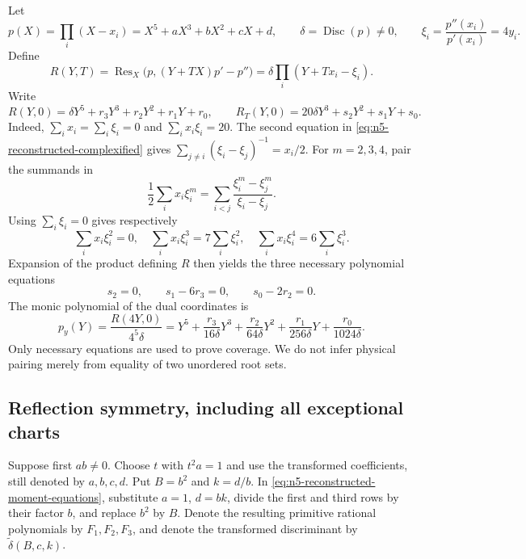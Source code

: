 \documentclass[11pt]{article}
\theoremstyle{remark}
\numberwithin{equation}{section}
\begin{document}
Let
\[
 p(X)=\prod_i(X-x_i)=X^5+aX^3+bX^2+cX+d,
 \qquad \delta=\operatorname{Disc}(p)\ne0,
 \qquad \xi_i=\frac{p''(x_i)}{p'(x_i)}=4y_i.
\]
Define
\[
 R(Y,T)=\operatorname{Res}_X\bigl(p,(Y+TX)p'-p''\bigr)
        =\delta\prod_i(Y+Tx_i-\xi_i).
\]
Write
\[
 R(Y,0)=\delta Y^5+r_3Y^3+r_2Y^2+r_1Y+r_0,
 \qquad
 R_T(Y,0)=20\delta Y^3+s_2Y^2+s_1Y+s_0.
\]
Indeed, $\sum_i x_i=\sum_i\xi_i=0$ and
$\sum_i x_i\xi_i=20$. The second equation in
\eqref{eq:n5-reconstructed-complexified} gives
$\sum_{j\ne i}(\xi_i-\xi_j)^{-1}=x_i/2$.
For $m=2,3,4$, pair the summands in
\[
 \frac12\sum_i x_i\xi_i^m
 =\sum_{i<j}\frac{\xi_i^m-\xi_j^m}{\xi_i-\xi_j}.
\]
Using $\sum_i\xi_i=0$ gives respectively
\[
 \sum_i x_i\xi_i^2=0,\quad
 \sum_i x_i\xi_i^3=7\sum_i\xi_i^2,\quad
 \sum_i x_i\xi_i^4=6\sum_i\xi_i^3.
\]
Expansion of the product defining $R$ then yields the three necessary
polynomial equations
\begin{equation}\label{eq:n5-reconstructed-moment-equations}
 s_2=0,\qquad s_1-6r_3=0,\qquad s_0-2r_2=0.
\end{equation}
The monic polynomial of the dual coordinates is
\begin{equation}\label{eq:n5-reconstructed-dual}
 p_y(Y)=\frac{R(4Y,0)}{4^5\delta}
 =Y^5+\frac{r_3}{16\delta}Y^3+
       \frac{r_2}{64\delta}Y^2+
       \frac{r_1}{256\delta}Y+
       \frac{r_0}{1024\delta}.
\end{equation}
Only necessary equations are used to prove coverage. We do not infer
physical pairing merely from equality of two unordered root sets.

\subsection{Reflection symmetry, including all exceptional charts}
Suppose first $ab\ne0$. Choose $t$ with $t^2a=1$ and use the transformed
coefficients, still denoted by $a,b,c,d$. Put $B=b^2$ and $k=d/b$.
In \eqref{eq:n5-reconstructed-moment-equations}, substitute $a=1$,
$d=bk$, divide the first and third rows by their factor $b$, and replace
$b^2$ by $B$. Denote the resulting primitive rational polynomials by
$F_1,F_2,F_3$, and denote the transformed discriminant by
$\widetilde\delta(B,c,k)$.
\end{document}
